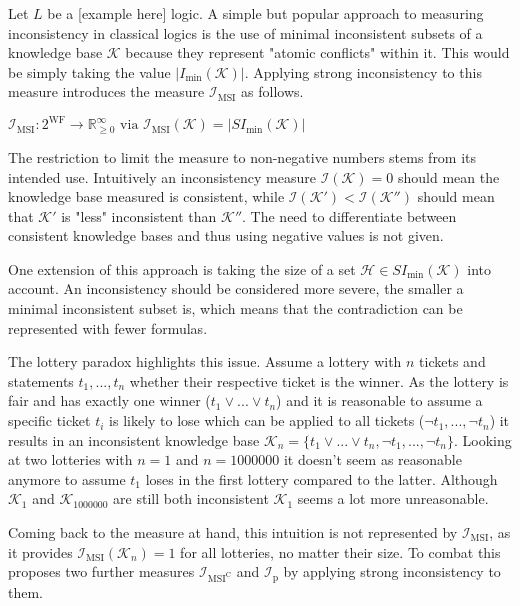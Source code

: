 Let \(L\) be a [example here] logic. A simple but popular approach to measuring inconsistency in classical logics is the use of minimal inconsistent subsets of a knowledge base \(\mathcal{K}\) because they represent "atomic conflicts" within it. This would be simply taking the value \(\left| I_{\min}(\mathcal{K}) \right|\). Applying strong inconsistency to this measure introduces the measure \(\mathcal{I}_{\text{MSI}}\) as follows.

\begin{definition}
    \(\mathcal{I}_{\text{MSI}}: 2^{\text{WF}} \rightarrow \mathbb{R}_{\geq 0}^{\infty} \text{ via } \mathcal{I}_{\text{MSI}}(\mathcal{K}) = \left| SI_{\min}(\mathcal{K}) \right|\)
\end{definition}

The restriction to limit the measure to non-negative numbers stems from its intended use. Intuitively an inconsistency measure \(\mathcal{I}(\mathcal{K}) = 0\) should mean the knowledge base measured is consistent, while \(\mathcal{I}(\mathcal{K}') < \mathcal{I}(\mathcal{K}'')\) should mean that \(\mathcal{K}'\) is "less" inconsistent than \(\mathcal{K}''\). The need to differentiate between consistent knowledge bases and thus using negative values is not given.

One extension of this approach is taking the size of a set \(\mathcal{H} \in SI_{\min}(\mathcal{K})\) into account. An inconsistency should be considered more severe, the smaller a minimal inconsistent subset is, which means that the contradiction can be represented with fewer formulas.

The lottery paradox \cite{kyburg_probability_1961} highlights this issue.
Assume a lottery with \(n\) tickets and statements \(t_1, ..., t_n\) whether their respective ticket is the winner. As the lottery is fair and has exactly one winner (\(t_1 \lor ... \lor t_n\)) and it is reasonable to assume a specific ticket \(t_i\) is likely to lose which can be applied to all tickets (\(\neg t_1, ..., \neg t_n\)) it results in an inconsistent knowledge base \(\mathcal{K}_n = \{ t_1 \lor ... \lor t_n, \neg t_1, ..., \neg t_n \}\). Looking at two lotteries with \(n = 1\) and \(n = 1000000\) it doesn't seem as reasonable anymore to assume \(t_1\) loses in the first lottery compared to the latter. Although \(\mathcal{K}_1\) and \(\mathcal{K}_{1000000}\) are still both inconsistent \(\mathcal{K}_1\) seems a lot more unreasonable.

Coming back to the measure at hand, this intuition is not represented by \(\mathcal{I}_{\text{MSI}}\), as it provides \(\mathcal{I}_{\text{MSI}}(\mathcal{K}_n) = 1\) for all lotteries, no matter their size. To combat this \cite{ulbricht_handling_2020} proposes two further measures \(\mathcal{I}_{\text{MSI}^\text{C}}\) and \(\mathcal{I}_{\text{p}}\) by applying strong inconsistency to them.

